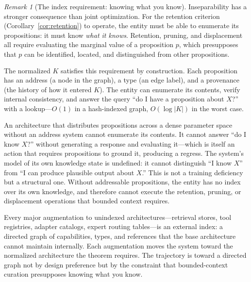 \documentclass[11pt]{article}
\theoremstyle{definition}
\theoremstyle{remark}
\newtheorem*{remark}{Remark}
\begin{document}
\begin{remark}[The index requirement: knowing what you know]
\label{rem:index}
Inseparability has a stronger consequence than joint optimization.
For the retention criterion (Corollary~\ref{cor:retention}) to
operate, the entity must be able to enumerate its propositions: it
must know \emph{what it knows}. Retention, pruning, and displacement
all require evaluating the marginal value of a proposition $p$, which
presupposes that $p$ can be identified, located, and distinguished
from other propositions.

The normalized $K$ satisfies this requirement by construction. Each
proposition has an address (a node in the graph), a type (an edge
label), and a provenance (the history of how it entered $K$). The
entity can enumerate its contents, verify internal consistency, and
answer the query ``do I have a proposition about $X$?'' with a
lookup---$O(1)$ in a hash-indexed graph, $O(\log |K|)$ in the worst
case.

An architecture that distributes propositions across a dense parameter
space without an address system cannot enumerate its contents. It
cannot answer ``do I know $X$?'' without generating a response and
evaluating it---which is itself an action that requires propositions
to ground it, producing a regress. The system's model of its own
knowledge state is undefined: it cannot distinguish ``I know $X$''
from ``I can produce plausible output about $X$.'' This is not a
training deficiency but a structural one. Without addressable
propositions, the entity has no index over its own knowledge, and
therefore cannot execute the retention, pruning, or displacement
operations that bounded context requires.

Every major augmentation to unindexed architectures---retrieval stores,
tool registries, adapter catalogs, expert routing tables---is an
external index: a directed graph of capabilities, types, and
references that the base architecture cannot maintain internally. Each
augmentation moves the system toward the normalized architecture the
theorem requires. The trajectory is toward a directed graph not by
design preference but by the constraint that bounded-context curation
presupposes knowing what you know.
\end{remark}
\end{document}
